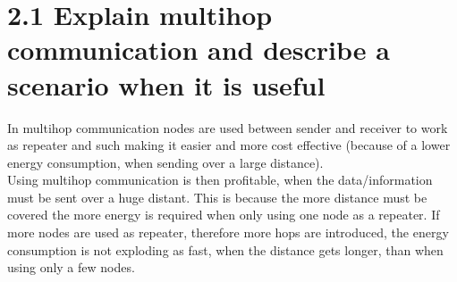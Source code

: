 \documentclass{article}
\begin{document}
	\pagestyle{fancy}
	\hfill
	
	\section*{2.1 Explain multihop communication and describe a scenario when it is useful}
	\begin{adjustwidth}{2em}{2em}
		In multihop communication nodes are used between sender and receiver to work as repeater and such making it easier and more cost effective (because of a lower energy consumption, when sending over a large distance). \\
		Using multihop communication is then profitable, when the data/information must be sent over a huge distant. This is because the more distance must be covered the more energy is required when only using one node as a repeater. If more nodes are used as repeater, therefore more hops are introduced, the energy consumption is not exploding as fast, when the distance gets longer, than when using only a few nodes.
	\end{adjustwidth}
	
\end{document}
